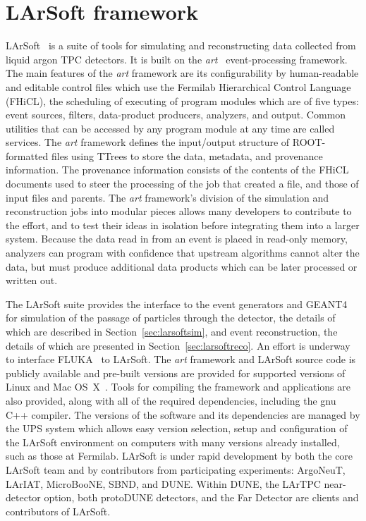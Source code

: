 \section{LArSoft framework}

LArSoft~\cite{larsoft} is a suite of tools for simulating and
reconstructing data collected from liquid argon TPC detectors.  It is
built on the {\it art}~\cite{art} event-processing framework.  The
main features of the {\it art} framework are its configurability by
human-readable and editable control files which use the Fermilab
Hierarchical Control Language (FHiCL), the scheduling of executing of
program modules which are of five types: event sources, filters,
data-product producers, analyzers, and output.  Common utilities that
can be accessed by any program module at any time are called services.
The {\it art} framework defines the input/output structure of
ROOT-formatted files using TTrees to store the data, metadata, and
provenance information.  The provenance information consists of the
contents of the FHiCL documents used to steer the processing of the
job that created a file, and those of input files and parents.  The
{\it art} framework's division of the simulation and reconstruction
jobs into modular pieces allows many developers to contribute to the
effort, and to test their ideas in isolation before integrating them
into a larger system.  Because the data read in from an event is
placed in read-only memory, analyzers can program with confidence that
upstream algorithms cannot alter the data, but must produce additional
data products which can be later processed or written out.

The LArSoft suite provides the interface to the event generators and
GEANT4~\cite{geant4} for simulation of the passage of particles
through the detector, the details of which are described in
Section~\ref{sec:larsoftsim}, and event reconstruction, the details of
which are presented in Section~\ref{sec:larsoftreco}.  An effort is
underway to interface FLUKA~\cite{fluka} to LArSoft.  The {\it art}
framework and LArSoft source code is publicly available and pre-built
versions are provided for supported versions of Linux and Mac
OS~X~\cite{scisoft}.  Tools for compiling the framework and
applications are also provided, along with all of the required
dependencies, including the gnu C++ compiler.  The versions of the
software and its dependencies are managed by the UPS system which
allows easy version selection, setup and configuration of the LArSoft
environment on computers with many versions already installed, such as
those at Fermilab.  LArSoft is under rapid development by both the
core LArSoft team and by contributors from participating experiments:
ArgoNeuT, LArIAT, MicroBooNE, SBND, and DUNE.  Within DUNE, the LArTPC
near-detector option, both protoDUNE detectors, and the Far Detector
are clients and contributors of LArSoft.

